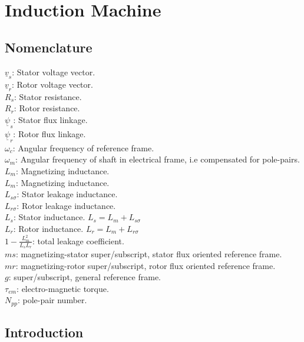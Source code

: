 \documentclass[]{book}
\begin{document}
\hypertarget{induction-machine}{%
\chapter{Induction Machine}\label{induction-machine}}

\hypertarget{nomenclature}{%
\section{Nomenclature}\label{nomenclature}}

\(\underline{v}_s\): Stator voltage vector.\\
\(\underline{v}_r\): Rotor voltage vector.\\
\(R_s\): Stator resistance.\\
\(R_r\): Rotor resistance.\\
\(\underline{\psi}_s\): Stator flux linkage.\\
\(\underline{\psi}_r\): Rotor flux linkage.\\
\(\omega_c\): Angular frequency of reference frame.\\
\(\omega_m\): Angular frequency of shaft in electrical frame, i.e compensated for pole-pairs.\\
\(L_m\): Magnetizing inductance.\\
\(L_m\): Magnetizing inductance.\\
\(L_{s\sigma}\): Stator leakage inductance.\\
\(L_{r\sigma}\): Rotor leakage inductance.\\
\(L_s\): Stator inductance. \(L_s = L_m + L_{s\sigma}\)\\
\(L_r\): Rotor inductance. \(L_r = L_m + L_{r\sigma}\)\\
\(1-\frac{L^2_m}{L_sL_r}\): total leakage coefficient.\\
\(ms\): magnetizing-stator super/subscript, stator flux oriented reference frame.\\
\(mr\): magnetizing-rotor super/subscript, rotor flux oriented reference frame.\\
\(g\): super/subscript, general reference frame.\\
\(\tau_{em}\): electro-magnetic torque.\\
\(N_{pp}\): pole-pair number.\\

\hypertarget{introduction}{%
\section{Introduction}\label{introduction}}
\end{document}
